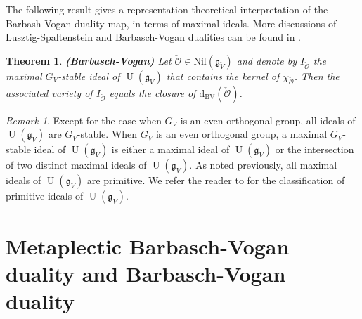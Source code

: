 \documentclass[12pt,a4paper]{amsart}
\newcommand{\BC}{{\mathbb {C}}}
\newcommand{\CO}{{\mathcal {O}}}
\newcommand{\oU}{\operatorname{U}}
\newcommand{\g}{\mathfrak g}
\newcommand{\p}{\mathfrak p}
\renewcommand{\l}{\mathfrak l}
\newcommand{\s}{\mathfrak s}
\renewcommand{\o}{\mathfrak o}
\numberwithin{equation}{section}
\newtheorem{thm}{Theorem}[section]
\theoremstyle{remark}
\newtheorem*{remark}{Remark}
\begin{document}
The following result \cite[Corollary A3]{BVUni} gives a representation-theoretical interpretation of the Barbash-Vogan duality map, in terms of maximal ideals. More discussions of Lusztig-Spaltenstein and Barbasch-Vogan dualities can be found in \cite[Section 3.5]{Ach}.

\begin{thm}\label{DesBV} {\bf {\upshape (Barbasch-Vogan)}}
Let $\check \CO\in  \overline{\mathrm{Nil}}(\g_{\check V})$ and denote by $I_{\check \CO}$ the maximal $G_V$-stable ideal of $\oU(\g_V)$ that contains the kernel of $\chi_{\check \CO}$. Then the associated variety of $I_{\check \CO}$ equals the closure of ${\mathrm d}_{\mathrm{BV}}(\check \CO)$.
\end{thm}

\begin{remark} Except for the case when $G_V$ is an even orthogonal group, all ideals of $\oU(\g_V)$ are $G_V$-stable. When $G_V$ is an even orthogonal group, a maximal $G_V$-stable ideal of $\oU(\g_V)$ is either a maximal ideal of $\oU(\g_V)$ or the intersection of two distinct maximal ideals of $\oU(\g_V)$. As noted previously, all maximal ideals of $\oU(\g_V)$ are primitive.
We refer the reader to \cite{BVPri1} for the classification of primitive ideals of $\oU(\g_V)$.
\end{remark}


\section{Metaplectic Barbasch-Vogan duality and Barbasch-Vogan duality}



\end{document}

